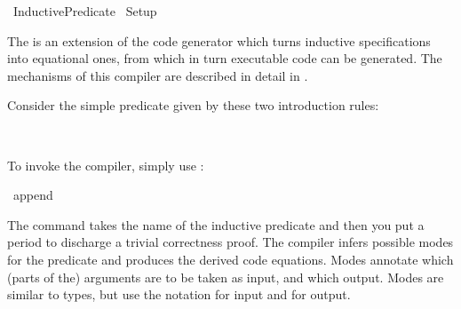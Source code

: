 %
\begin{isabellebody}%
\def\isabellecontext{Inductive{\isaliteral{5F}{\isacharunderscore}}Predicate}%
%
\isadelimtheory
%
\endisadelimtheory
%
\isatagtheory
{}\isamarkupfalse%
\ Inductive{}Predicate\isanewline
{}\ Setup\isanewline
{}\isanewline
%
\endisatagtheory
{\isafoldtheory}%
%
\isadelimtheory
%
\endisadelimtheory
%
\isadeliminvisible
%
\endisadeliminvisible
%
\isataginvisible
%
\endisataginvisible
{\isafoldinvisible}%
%
\isadeliminvisible
%
\endisadeliminvisible
%
\isamarkuptrue%
%
\begin{isamarkuptext}%
The  is an extension of the code generator
  which turns inductive specifications into equational ones, from
  which in turn executable code can be generated.  The mechanisms of
  this compiler are described in detail in
  \cite{Berghofer-Bulwahn-Haftmann:2009:TPHOL}.

  Consider the simple predicate  given by these two
  introduction rules:%
\end{isamarkuptext}%
\isamarkuptrue%
%
\isadelimquote
%
\endisadelimquote
%
\isatagquote
%
\begin{isamarkuptext}%
 \\
\end{isamarkuptext}%
\isamarkuptrue%
%
\endisatagquote
{\isafoldquote}%
%
\isadelimquote
%
\endisadelimquote
%
\begin{isamarkuptext}%
\noindent To invoke the compiler, simply use \hypertarget{command.code-pred}{\hyperlink{command.code-pred}{\mbox{}}}:%
\end{isamarkuptext}%
\isamarkuptrue%
%
\isadelimquote
%
\endisadelimquote
%
\isatagquote
{}\isamarkupfalse%
\ append\ \isamarkupfalse%
%
\endisatagquote
{\isafoldquote}%
%
\isadelimquote
%
\endisadelimquote
%
\begin{isamarkuptext}%
\noindent The \hyperlink{command.code-pred}{\mbox{}} command takes the name of the
  inductive predicate and then you put a period to discharge a trivial
  correctness proof.  The compiler infers possible modes for the
  predicate and produces the derived code equations.  Modes annotate
  which (parts of the) arguments are to be taken as input, and which
  output. Modes are similar to types, but use the notation 
  for input and  for output.
 

\end{isamarkuptext}
\end{isabellebody}
